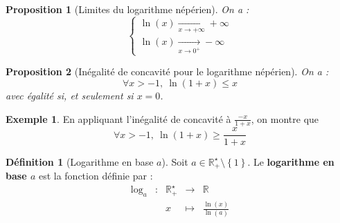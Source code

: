 \documentclass[french]{book}
\newcommand{\R}{\mathbb{R}}
\newcommand{\st}{^\star}
\theoremstyle{plain}
\newtheorem{prop}{Proposition}[chapter]
\theoremstyle{definition}
\newtheorem{dfn}{Définition}[chapter]
\newtheorem{exa}{Exemple}[chapter]
\theoremstyle{remark}
\begin{document}
\begin{prop}[Limites du logarithme népérien]
	On a : $$\begin{cases}
		\ln(x)\xrightarrow[x\to +\infty]{}+\infty\\
		\ln(x)\xrightarrow[x\to 0^+]{}-\infty
	\end{cases}$$
\end{prop}
\begin{prop}[Inégalité de concavité pour le logarithme népérien]
	On a : $$\forall x>-1,\ \ln(1+x)\leqslant x$$ avec égalité si, et seulement si $x=0$.
\end{prop}
\begin{exa}
	En appliquant l'inégalité de concavité à $\frac{-x}{1+x}$, on montre que $$\forall x>-1,\ \ln(1+x)\geqslant\frac{x}{1+x}$$
\end{exa}
\begin{dfn}[Logarithme en base $a$]
	Soit $a\in\R_+\st\setminus\left\{1\right\}$. Le \textbf{logarithme en base $a$} est la fonction définie par : $$\begin{array}{ccccc}\log_a&:&\R_+\st&\rightarrow&\R\\&&x&\mapsto&\displaystyle\frac{\ln(x)}{\ln(a)}\end{array}$$
\end{dfn}
\end{document}
